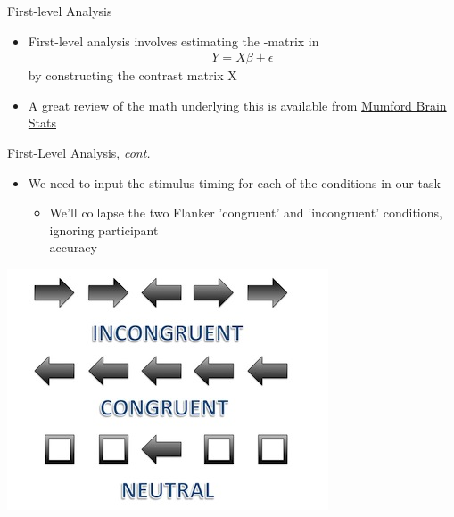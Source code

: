 \documentclass[t,12pt]{beamer}
\begin{document}
\begin{frame}{First-level Analysis}
\vspace{10pt}
\begin{itemize}
\setlength\itemsep{1em}
\item First-level analysis involves estimating the \textbeta{}-matrix in
\begin{eqnarray*}
Y = X\beta + \epsilon
\end{eqnarray*}
by constructing the contrast matrix X
\item A great review of the math underlying this is available from \href{http://mumfordbrainstats.tumblr.com/post/125163337126/day-4-multiple-linear-regression}{Mumford Brain Stats}
\end{itemize}
\end{frame}

\begin{frame}{First-Level Analysis, \textit{cont.}}
\vspace{10pt}
\begin{itemize}
\setlength\itemsep{1em}
\item We need to input the stimulus timing for each of the conditions in our task
\vspace{4pt}
\begin{itemize}
\item We'll collapse the two Flanker 'congruent' and 'incongruent' conditions, ignoring participant \\ accuracy
\end{itemize}
\end{itemize}
\vspace{4pt}
\centering
\includegraphics[width=.5\textwidth]{images/flanker_task.jpg}
\end{frame}
\end{document}
